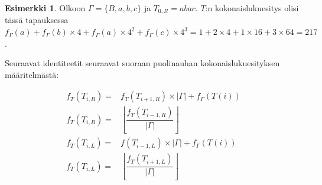 \documentclass[a4paper, 12pt]{article}
\theoremstyle{definition}
\newtheorem{example}[mydef]{Esimerkki}
\theoremstyle{plain}
\begin{document}
\begin{example}
Olkoon $\Gamma = \{B, a, b, c\}$ ja $T_{0, R} = abac$. $T$:n kokonaislukuesitys olisi tässä tapauksessa $f_\Gamma(a) + f_\Gamma(b) \times 4 + f_\Gamma(a) \times 4^2 + f_\Gamma(c) \times 4^3= 1 + 2 \times 4 + 1 \times 16 + 3 \times 64 = 217$.
\end{example}

Seuraavat identiteetit seuraavat suoraan puolinauhan kokonaislukuesityksen määritelmästä:
\begin{center}
\begin{align*}
f_T(T_{i,R}) =& f_T(T_{i+1,R}) \times |\Gamma| + f_\Gamma(T(i))\\
f_T(T_{i,R}) =& \left\lfloor\dfrac{f_T(T_{i-1, R})}{|\Gamma|}\right\rfloor \\
f_T(T_{i,L}) =& f(T_{i-1,L}) \times |\Gamma| + f_\Gamma(T(i)) \\
f_T(T_{i,L}) =& \left\lfloor\dfrac{f_T(T_{i+1, L})}{|\Gamma|}\right\rfloor \\
\end{align*}
\end{center}
\end{document}
